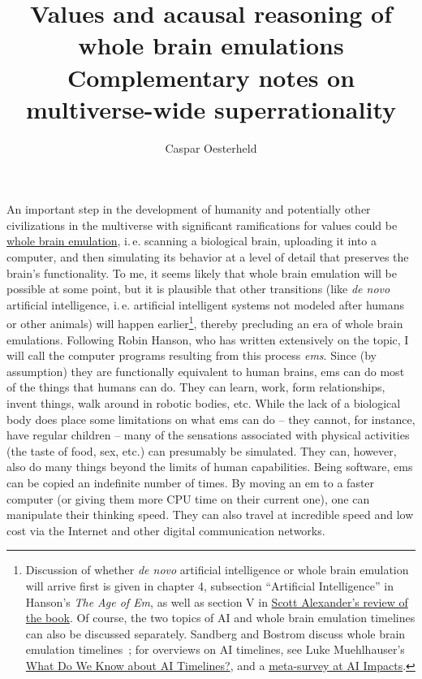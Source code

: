 \documentclass[]{article}
\title{Values and acausal reasoning of
whole brain emulations\\ \vspace{5mm} \small{Complementary notes on multiverse-wide superrationality}}
\author{Caspar Oesterheld}
\date{}
\begin{document}
\maketitle

An important step in the development of humanity and potentially other
civilizations in the multiverse with significant ramifications for
values could be
\href{https://en.wikipedia.org/wiki/Mind_uploading}{whole
brain emulation}, i.\,e. scanning a biological brain, uploading it into
a computer, and then simulating its behavior at a level of detail that
preserves the brain's functionality. To me, it seems likely that whole
brain emulation will be possible at some point, but it is plausible that
other transitions (like \emph{de novo} artificial intelligence, i.\,e.
artificial intelligent systems not modeled after humans or other
animals) will happen earlier\footnote{Discussion of whether \emph{de
  novo} artificial intelligence or whole brain emulation will arrive
  first is given in chapter 4, subsection ``Artificial Intelligence'' in
  Hanson's \emph{The Age of Em}, as well as section V in
  \href{http://slatestarcodex.com/2016/05/28/book-review-age-of-em/}{Scott
  Alexander's review of the book}. Of course, the two topics of AI and
  whole brain emulation timelines can also be discussed separately.
  Sandberg and Bostrom discuss whole brain emulation
  timelines~\citeyear{Sandberg2008-nd}; for overviews on AI timelines, see Luke Muehlhauser's
  \href{http://www.openphilanthropy.org/focus/global-catastrophic-risks/potential-risks-advanced-artificial-intelligence/ai-timelines}{What Do We Know about AI Timelines?}, and a
  \href{http://aiimpacts.org/ai-timeline-surveys/}{meta-survey at
  AI Impacts}.}, thereby precluding an era of whole brain
emulations. Following Robin Hanson, who has written extensively on the
topic, I will call the computer programs resulting from this process
\emph{ems}. Since (by assumption) they are functionally equivalent to
human brains, ems can do most of the things that humans can do. They can
learn, work, form relationships, invent things, walk around in robotic
bodies, etc. While the lack of a biological body does place some
limitations on what ems can do -- they cannot, for instance, have
regular children -- many of the sensations associated with physical
activities (the taste of food, sex, etc.) can presumably be simulated.
They can, however, also do many things beyond the limits of human
capabilities. Being software, ems can be copied an indefinite number of
times. By moving an em to a faster computer (or giving them more CPU
time on their current one), one can manipulate their thinking speed.
They can also travel at incredible speed and low cost via the Internet
and other digital communication networks.
\end{document}
